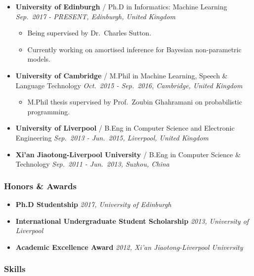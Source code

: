 \documentclass[11pt, a4paper]{article}
\providecommand{\tightlist}{%
  \setlength{\itemsep}{0pt}\setlength{\parskip}{0pt}}
\begin{document}
\begin{raggedright}
\begin{itemize}
\tightlist
\item
  \textbf{University of Edinburgh} / Ph.D in Informatics: Machine
  Learning \emph{Sep.~2017 - PRESENT, Edinburgh, United Kingdom}

  \begin{itemize}
  \tightlist
  \item
    Being supervised by Dr.~Charles Sutton.
  \item
    Currently working on amortised inference for Bayesian non-parametric
    models.
  \end{itemize}
\item
  \textbf{University of Cambridge} / M.Phil in Machine Learning, Speech
  \& Language Technology \emph{Oct.~2015 - Sep.~2016, Cambridge, United
  Kingdom}

  \begin{itemize}
  \tightlist
  \item
    M.Phil thesis supervised by Prof.~Zoubin Ghahramani on probabilistic
    programming.
  \end{itemize}
\item
  \textbf{University of Liverpool} / B.Eng in Computer Science and
  Electronic Engineering \emph{Sep.~2013 - Jun.~2015, Liverpool, United
  Kingdom}
\item
  \textbf{Xi'an Jiaotong-Liverpool University} / B.Eng in Computer
  Science \& Technology \emph{Sep.~2011 - Jun.~2013, Suzhou, China}
\end{itemize}

\subsubsection{Honors \& Awards}

\begin{itemize}
\tightlist
\item
  \textbf{Ph.D Studentship} \emph{2017, University of Edinburgh}
\item
  \textbf{International Undergraduate Student Scholarship} \emph{2013,
  University of Liverpool}
\item
  \textbf{Academic Excellence Award} \emph{2012, Xi'an
  Jiaotong-Liverpool University}
\end{itemize}

\subsubsection{Skills}


\end{raggedright}
\end{document}
